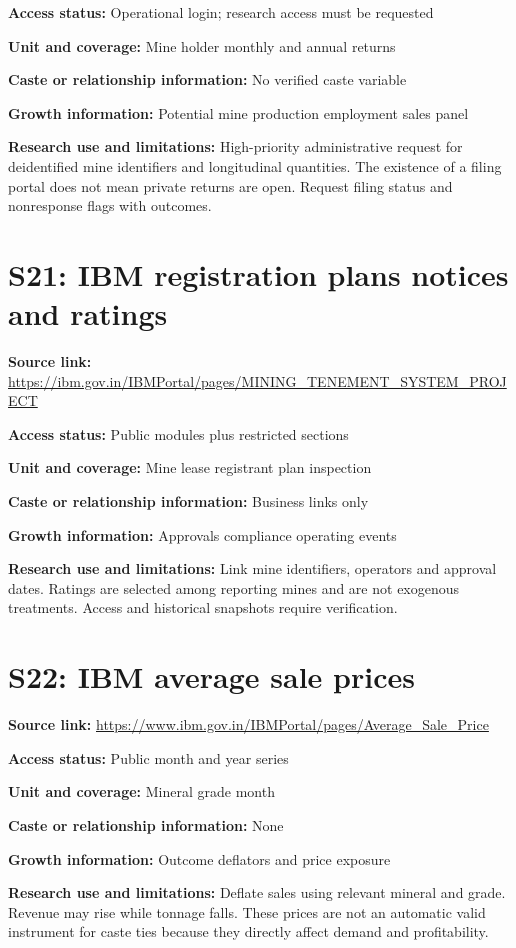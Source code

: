 \documentclass[11pt,a4paper]{report}
\begin{document}
\textbf{Access status:} Operational login; research access must be requested

\textbf{Unit and coverage:} Mine holder monthly and annual returns

\textbf{Caste or relationship information:} No verified caste variable

\textbf{Growth information:} Potential mine production employment sales panel

\textbf{Research use and limitations:} High-priority administrative request for deidentified mine identifiers and longitudinal quantities. The existence of a filing portal does not mean private returns are open. Request filing status and nonresponse flags with outcomes.

\section{S21: IBM registration plans notices and ratings}\hypertarget{S21}{}
\textbf{Source link:} \url{https://ibm.gov.in/IBMPortal/pages/MINING_TENEMENT_SYSTEM_PROJECT}

\textbf{Access status:} Public modules plus restricted sections

\textbf{Unit and coverage:} Mine lease registrant plan inspection

\textbf{Caste or relationship information:} Business links only

\textbf{Growth information:} Approvals compliance operating events

\textbf{Research use and limitations:} Link mine identifiers, operators and approval dates. Ratings are selected among reporting mines and are not exogenous treatments. Access and historical snapshots require verification.

\section{S22: IBM average sale prices}\hypertarget{S22}{}
\textbf{Source link:} \url{https://www.ibm.gov.in/IBMPortal/pages/Average_Sale_Price}

\textbf{Access status:} Public month and year series

\textbf{Unit and coverage:} Mineral grade month

\textbf{Caste or relationship information:} None

\textbf{Growth information:} Outcome deflators and price exposure

\textbf{Research use and limitations:} Deflate sales using relevant mineral and grade. Revenue may rise while tonnage falls. These prices are not an automatic valid instrument for caste ties because they directly affect demand and profitability.
\end{document}
